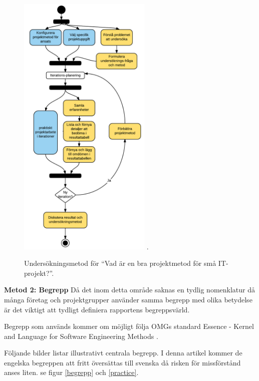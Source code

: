 \documentclass[conference,a4paper]{IEEEtran}
\begin{document}
\begin{figure}[H]
\centering
\includegraphics[width=2.5in]{invmethod}
\DeclareGraphicsExtensions.
\caption{Undersökningsmetod för ``Vad är en bra projektmetod för små IT-projekt?''.}
\label{undersokningsmetod}
\end{figure}

\textbf{Metod 2: Begrepp} Då det inom detta område saknas en tydlig nomenklatur då många företag och projektgrupper använder samma begrepp med olika betydelse är det viktigt att tydligt definiera rapportens begreppsvärld.

Begrepp som används kommer om möjligt följa OMGs \cite{OMG} standard Essence - Kernel and Language for Software Engineering Methods \cite{Jacobson13}.

Följande bilder listar illustrativt centrala begrepp. I denna artikel kommer de engelska begreppen att fritt översättas till svenska då risken för missförstånd anses liten. se figur \ref{begrepp} och \ref{practice}.
\end{document}
